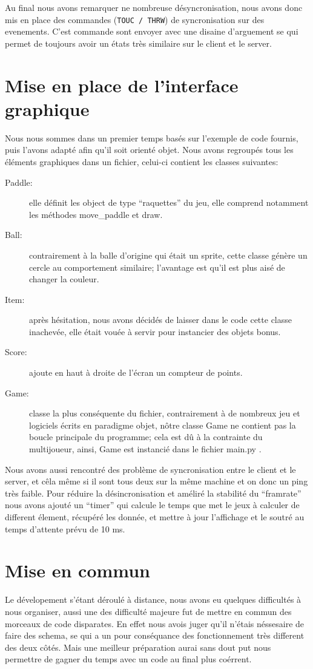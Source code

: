 \documentclass[12pt]{report}
\begin{document}
Au final nous avons remarquer ne nombreuse désyncronisation, nous avons donc
mis en place des commandes (\texttt{TOUC / THRW}) de syncronisation sur des
evenements.
C'est commande sont envoyer avec une disaine d'arguement se qui permet de toujours
avoir un états très similaire sur le client et le server.

\chapter{Mise en place de l'interface graphique}
Nous nous sommes dans un premier temps basés sur l'exemple de code
fournis, puis l'avons adapté afin qu'il soit orienté objet. Nous avons
regroupés tous les éléments graphiques dans un fichier, celui-ci
contient les classes suivantes:

\begin{description}
  \item [Paddle:] elle définit les object de type ``raquettes'' du jeu, elle
    comprend notamment les méthodes move\_paddle et draw.
  \item [Ball:] contrairement à la balle d'origine qui était un
    sprite, cette classe génère un cercle au comportement similaire;
    l'avantage est qu'il est plus aisé de changer la couleur.
  \item [Item: ] après hésitation, nous avons décidés de laisser dans
    le code cette classe inachevée, elle était vouée à servir pour
    instancier des objets bonus.
  \item [Score: ] ajoute en haut à droite de l'écran un compteur de
    points.
  \item [Game: ] classe la plus conséquente du fichier,
    contrairement à de nombreux jeu et logiciels écrits en paradigme
    objet, nôtre classe Game ne contient pas la boucle principale du
    programme; cela est dû à la contrainte du multijoueur, ainsi, Game
    est instancié dans le fichier main.py .
\end{description}

Nous avons aussi rencontré des problème de syncronisation entre le client
et le server, et cêla même si il sont tous deux sur la même machine et on
donc un ping très faible.
Pour réduire la désincronisation et améliré la stabilité du ``framrate''
nous avons ajouté un ``timer'' qui calcule le temps que met le jeux à calculer
de different élement, récupéré les donnée, et mettre à jour l'affichage et le
soutré au temps d'attente prévu de 10 ms.

\chapter{Mise en commun}
Le dévelopement s'étant déroulé à distance, nous avons eu quelques
difficultés à nous organiser, aussi une des difficulté majeure fut de
mettre en commun des morceaux de code disparates.
En effet nous avois juger qu'il n'étais néssesaire de faire des
schema, se qui a un pour conséquance des fonctionnement très different
des deux côtés.
Mais une meilleur préparation aurai sans dout put nous
permettre de gagner du temps avec un code au final plus coérrent. 
\end{document}
